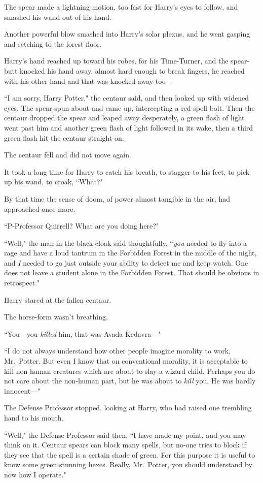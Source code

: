 The spear made a lightning motion, too fast for Harry's eyes to follow, and smashed his wand out of his hand.

Another powerful blow smashed into Harry's solar plexus, and he went gasping and retching to the forest floor.

Harry's hand reached up toward his robes, for his Time-Turner, and the spear-butt knocked his hand away, almost hard enough to break fingers, he reached with his other hand and that was knocked away too—

``I am sorry, Harry Potter," the centaur said, and then looked up with widened eyes. The spear spun about and came up, intercepting a red spell bolt. Then the centaur dropped the spear and leaped away desperately, a green flash of light went past him and another green flash of light followed in its wake, then a third green flash hit the centaur straight-on.

The centaur fell and did not move again.

It took a long time for Harry to catch his breath, to stagger to his feet, to pick up his wand, to croak, ``What?"

By that time the sense of doom, of power almost tangible in the air, had approached once more.

``P-Professor Quirrell? What are you doing here?"

``Well," the man in the black cloak said thoughtfully, ``\emph{you} needed to fly into a rage and have a loud tantrum in the Forbidden Forest in the middle of the night, and \emph{I} needed to go just outside your ability to detect me and keep watch. One does not leave a student alone in the Forbidden Forest. That should be obvious in retrospect."

Harry stared at the fallen centaur.

The horse-form wasn't breathing.

``You—you \emph{killed} him, that was Avada Kedavra—"

``I do not always understand how other people imagine morality to work, Mr.~Potter. But even I know that on conventional morality, it is acceptable to kill non-human creatures which are about to slay a wizard child. Perhaps you do not care about the non-human part, but he was about to \emph{kill} you. He was hardly innocent—"

The Defense Professor stopped, looking at Harry, who had raised one trembling hand to his mouth.

``Well," the Defense Professor said then, ``I have made my point, and you may think on it. Centaur spears can block many spells, but no-one tries to block if they see that the spell is a certain shade of green. For this purpose it is useful to know some green stunning hexes. Really, Mr.~Potter, you should understand by now how I operate."

